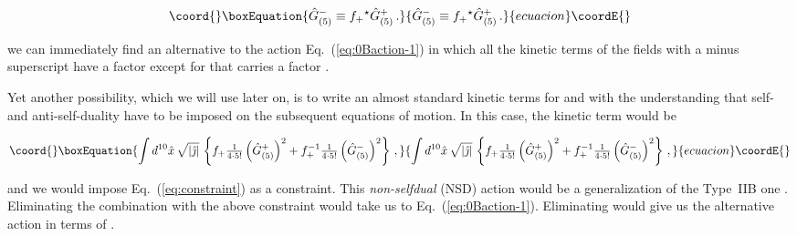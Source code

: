 \documentclass[12pt,a4paper]{article}
\begin{document}
\begin{equation}\coord{}\boxEquation{
\label{eq:constraint}
 \hat{G}^{-}_{(5)}\equiv f_{+} {}^{\star}\hat{G}^{+}_{(5)}\, .
}{
\hat{G}^{-}_{(5)}\equiv f_{+} {}^{\star}\hat{G}^{+}_{(5)}\, .
}{ecuacion}\coordE{}\end{equation}

\noindent we can immediately find an alternative to the action
Eq.~(\ref{eq:0Baction-1}) in which all the kinetic terms of the fields
with a minus superscript have a factor \coordHE{} except for \coordHE{} that carries a factor
\coordHE{}.

Yet another possibility, which we will use later on, is to write an
almost standard kinetic terms for \coordHE{} and
\coordHE{} with the understanding that self- and
anti-self-duality have to be imposed on the subsequent equations of
motion. In this case, the kinetic term would be

\begin{equation}\coord{}\boxEquation{
\label{eq:NSDkineticterms}
\int d^{10}\hat{x}\, \sqrt{|\hat{\jmath}|}\, 
\left\{f_{+}{\textstyle\frac{1}{4\cdot 5!}}
\left(\hat{G}^{+}_{(5)}\right)^{2}
+f_{+}^{-1}{\textstyle\frac{1}{4\cdot 5!}}
\left(\hat{G}^{-}_{(5)}\right)^{2}\right\}\, ,
}{
\int d^{10}\hat{x}\, \sqrt{|\hat{\jmath}|}\, 
\left\{f_{+}{\textstyle\frac{1}{4\cdot 5!}}
\left(\hat{G}^{+}_{(5)}\right)^{2}
+f_{+}^{-1}{\textstyle\frac{1}{4\cdot 5!}}
\left(\hat{G}^{-}_{(5)}\right)^{2}\right\}\, ,
}{ecuacion}\coordE{}\end{equation}

\noindent and we would impose Eq.~(\ref{eq:constraint}) as a constraint.
This {\em non-selfdual} (NSD) action would be a generalization of the
Type~IIB one \cite{kn:BBO,kn:MO}. Eliminating the \coordHE{}
combination with the above constraint would take us to
Eq.~(\ref{eq:0Baction-1}). Eliminating \coordHE{} would give
us the  alternative action in terms of \coordHE{}.

\end{document}
